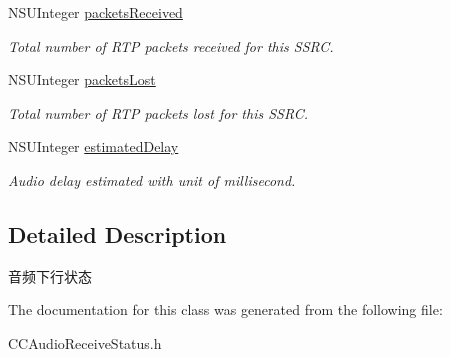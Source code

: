 \begin{DoxyCompactItemize}
N\+S\+U\+Integer \hyperlink{interface_c_c_audio_receive_status_a4c37e1a3729be1e4e875c803001b246f}{packets\+Received}
\begin{DoxyCompactList}\small\item\em Total number of R\+TP packets received for this S\+S\+RC. \end{DoxyCompactList}\item 
\mbox{\label{interface_c_c_audio_receive_status_ab1bd51006c4b2a52ac8eeb34ca18f3b1}} 
N\+S\+U\+Integer \hyperlink{interface_c_c_audio_receive_status_ab1bd51006c4b2a52ac8eeb34ca18f3b1}{packets\+Lost}
\begin{DoxyCompactList}\small\item\em Total number of R\+TP packets lost for this S\+S\+RC. \end{DoxyCompactList}\item 
\mbox{\label{interface_c_c_audio_receive_status_adfab77246dd2b33b31a57a6ea67c8f34}} 
N\+S\+U\+Integer \hyperlink{interface_c_c_audio_receive_status_adfab77246dd2b33b31a57a6ea67c8f34}{estimated\+Delay}
\begin{DoxyCompactList}\small\item\em Audio delay estimated with unit of millisecond. \end{DoxyCompactList}\end{DoxyCompactItemize}


\subsection{Detailed Description}
音频下行状态 

The documentation for this class was generated from the following file\+:\begin{DoxyCompactItemize}
\item 
C\+C\+Audio\+Receive\+Status.\+h\end{DoxyCompactItemize}
